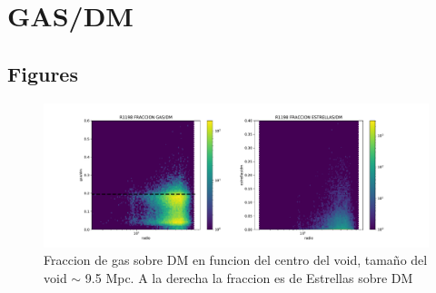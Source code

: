
\chapter{GAS/DM} %

\label{Chapter1} %


\newcommand{\keyword}[1]{\textbf{#1}}
\newcommand{\tabhead}[1]{\textbf{#1}}
\newcommand{\code}[1]{\texttt{#1}}
\newcommand{\file}[1]{\texttt{\bfseries#1}}
\newcommand{\option}[1]{\texttt{\itshape#1}}


\section{}









\section{Figures}


\begin{figure}[h]
\centering
\includegraphics[width=1\textwidth]{Figures/R1198_scatterFRACCIONES.pdf}
\decoRule
\caption[R1198 BARIONES/DM perfil (scatter) ]{Fraccion de gas sobre DM en funcion del centro del void, tamaño del void $\sim$ 9.5 Mpc. A la derecha la fraccion es de Estrellas sobre DM}
\label{fig:Electron}
\end{figure}

